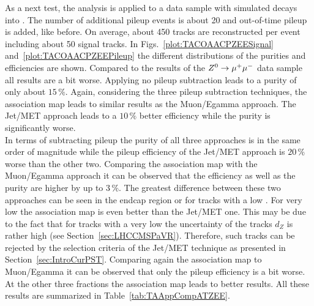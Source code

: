 As a next test, the analysis is applied to a data sample with simulated \Zz decays into \EE. The number of additional pileup events is about 20 and out-of-time pileup is added, like before. On average, about 450 tracks are reconstructed per event including about 50 signal tracks. In Figs.~\ref{plot:TACOAACPZEESignal} and~\ref{plot:TACOAACPZEEPileup} the different distributions of the purities and efficiencies are shown. Compared to the results of the ${Z^{0}}\rightarrow\mu^+\mu^-$ data sample all results are a bit worse. Applying no pileup subtraction leads to a purity of only about $15\,\%$. Again, considering the three pileup subtraction techniques, the association map leads to similar results as the Muon/Egamma approach. The Jet/MET approach leads to a $10\,\%$ better efficiency while the purity is significantly worse.\\
In terms of subtracting pileup the purity of all three approaches is in the same order of magnitude while the pileup efficiency of the Jet/MET approach is $20\,\%$ worse than the other two. Comparing the association map with the Muon/Egamma approach it can be observed that the efficiency as well as the purity are higher by up to $3\,\%$. The greatest difference between these two approaches can be seen in the endcap region or for tracks with a low \pt. For very low \pt the association map is even better than the Jet/MET one. This may be due to the fact that for tracks with a very low \pt the uncertainty of the tracks $d_{Z}$ is rather high (see Section~\ref{sec:LHCCMSPaVR}). Therefore, such tracks can be rejected by the selection criteria of the Jet/MET technique as presented in Section~\ref{sec:IntroCurPST}. Comparing again the association map to Muon/Egamma it can be observed that only the pileup efficiency is a bit worse. At the other three fractions the association map leads to better results.  All these results are summarized in Table~\ref{tab:TAAppCompATZEE}.

